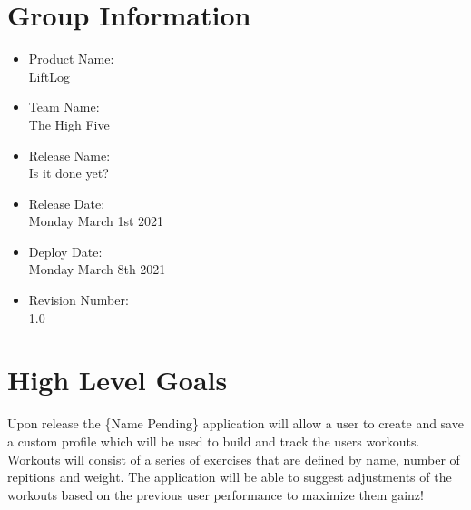\documentclass[12pt,letterpaper]{article}
\begin{document}
	\section*{Group Information}
		\begin{itemize}
			\item Product Name:\\
				LiftLog
			\item Team Name:\\
				The High Five
			\item Release Name:\\
				Is it done yet?
			\item Release Date:\\
				Monday March 1st 2021
			\item Deploy Date:\\
				Monday March 8th 2021
			\item Revision Number:\\
				1.0
		\end{itemize}
	\section{High Level Goals}
		Upon release the \{Name Pending\} application will allow a user to create and save a custom profile which will be used to build and track the users workouts. Workouts will consist of a series of exercises that are defined by name, number of repitions and weight. The application will be able to suggest adjustments of the workouts based on the previous user performance to maximize them gainz!
\end{document}
